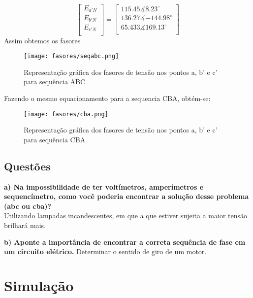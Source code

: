 \documentclass[a4paper, 12pt]{article}
\begin{document}
			\[\begin{bmatrix}
				E_{a'N} \\
				E_{b'N} \\
				E_{c'N} \\
			\end{bmatrix}
			=
			\begin{bmatrix}
				115.45\measuredangle{8.23^\circ} \\
				136.27\measuredangle{-144.98^\circ} \\
				65.433\measuredangle{169.13^\circ} \\
			\end{bmatrix}
			\]
		Assim obtemos os fasores
			\begin{figure}[H]
				\centering %
				\texttt{[image: fasores/seqabc.png]}
				\caption{Representação gráfica dos fasores de tensão nos pontos a, b' e c' para sequência ABC}
			\end{figure}
			\newpage
			Fazendo o mesmo equacionamento para a sequencia CBA, obtém-se:
			\begin{figure}[H]
				\centering %
				\texttt{[image: fasores/cba.png]}
				\caption{Representação gráfica dos fasores de tensão nos pontos a, b' e c' para sequência CBA}
			\end{figure}



















			\newpage
			\justifying
			\subsection{Questões}
			\textbf{a) Na impossibilidade de ter voltímetros, amperímetros e sequencímetro, como você poderia
encontrar a solução desse problema (abc ou cba)?
}\\
            Utilizando lampadas incandescentes, em que a que estiver sujeita a maior tensão brilhará mais.

			\textbf{b) Aponte a importância de encontrar a correta sequência de fase em um circuito elétrico.}
			Determinar o sentido de giro de um motor.

			\newpage
			\section{Simulação}
		\justifying
\end{document}
